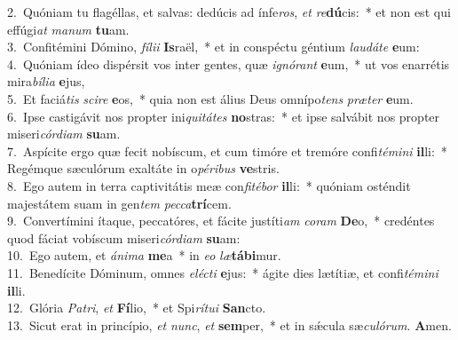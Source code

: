 {2.~}Quóniam tu flagéllas, et salvas: dedúcis ad ínfe\textit{ros}, \textit{et} \textit{re}\textbf{dú}cis:~* et non est qui effúgi\textit{at} \textit{ma}\textit{num} \textbf{tu}am.\\
{3.~}Confitémini Dómino, \textit{fí}\textit{li}\textit{i} \textbf{Is}raël,~* et in conspéctu géntium \textit{lau}\textit{dá}\textit{te} \textbf{e}um:\\
{4.~}Quóniam ídeo dispérsit vos inter gentes, quæ \textit{i}\textit{gnó}\textit{rant} \textbf{e}um,~* ut vos enarrétis mira\textit{bí}\textit{li}\textit{a} \textbf{e}jus,\\
{5.~}Et faciá\textit{tis} \textit{sci}\textit{re} \textbf{e}os,~* quia non est álius Deus omnípo\textit{tens} \textit{præ}\textit{ter} \textbf{e}um.\\
{6.~}Ipse castigávit nos propter ini\textit{qui}\textit{tá}\textit{tes} \textbf{no}stras:~* et ipse salvábit nos propter miseri\textit{cór}\textit{di}\textit{am} \textbf{su}am.\\
{7.~}Aspícite ergo quæ fecit nobíscum, et cum timóre et tremóre confi\textit{té}\textit{mi}\textit{ni} \textbf{il}li:~* Regémque sæculórum exaltáte in o\textit{pé}\textit{ri}\textit{bus} \textbf{ve}stris.\\
{8.~}Ego autem in terra captivitátis meæ con\textit{fi}\textit{té}\textit{bor} \textbf{il}li:~* quóniam osténdit majestátem suam in gen\textit{tem} \textit{pec}\textit{ca}\textbf{trí}cem.\\
{9.~}Convertímini ítaque, peccatóres, et fácite justíti\textit{am} \textit{co}\textit{ram} \textbf{De}o,~* credéntes quod fáciat vobíscum miseri\textit{cór}\textit{di}\textit{am} \textbf{su}am:\\
{10.~}Ego autem, et \textit{á}\textit{ni}\textit{ma} \textbf{me}a~* in \textit{e}\textit{o} \textit{læ}\textbf{tá}\textbf{bi}mur.\\
{11.~}Benedícite Dóminum, omnes \textit{e}\textit{lé}\textit{cti} \textbf{e}jus:~* ágite dies lætítiæ, et confi\textit{té}\textit{mi}\textit{ni} \textbf{il}li.\\
{12.~}Glória \textit{Pa}\textit{tri}, \textit{et} \textbf{Fí}lio,~* et Spi\textit{rí}\textit{tu}\textit{i} \textbf{San}cto.\\
{13.~}Sicut erat in princípio, \textit{et} \textit{nunc}, \textit{et} \textbf{sem}per,~* et in sǽcula sæ\textit{cu}\textit{ló}\textit{rum}. \textbf{A}men.\\
